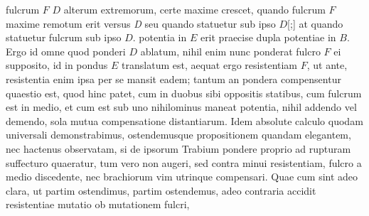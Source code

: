 fulcrum\protect{} $F$ 
$D$ alterum extremorum, certe maxime crescet, quando fulcrum\protect{}
$F$ maxime remotum erit versus \textit{D} seu quando
statuetur sub ipso $D$[;] at quando statuetur fulcrum\protect{}
sub ipso $D.$ potentia\protect{} in $E$ erit praecise dupla
potentiae\protect{} in $B.$
Ergo id omne quod ponderi\protect{} $D$
ablatum, nihil enim nunc ponderat\protect{} fulcro\protect{}
$F$ ei supposito, id in pondus\protect{} $E$ translatum
est, aequat ergo resistentiam\protect{} $F$, ut ante,
resistentia\protect{} enim ipsa per se mansit eadem;
tantum an pondera\protect{} compensentur quaestio
est, quod hinc patet, cum in duobus sibi oppositis
statibus, cum fulcrum\protect{} est in medio, et cum est sub uno
nihilominus maneat potentia,\protect{} nihil addendo vel demendo,
sola mutua compensatione distantiarum.
\pend
\pstart
Idem absolute calculo quodam universali demonstrabimus,
ostendemusque propositionem quandam elegantem, nec hactenus observatam,
si de ipsorum Trabium\protect{} pondere\protect{} proprio ad
rupturam\protect{} suffecturo quaeratur, tum vero
non augeri, sed contra minui resistentiam\protect{},
fulcro\protect{} a medio discedente, nec brachiorum\protect{} vim utrinque compensari. Quae cum
sint adeo clara, ut partim ostendimus, partim
ostendemus, adeo contraria 
accidit resistentiae\protect{} mutatio ob mutationem fulcri,\protect{} 
